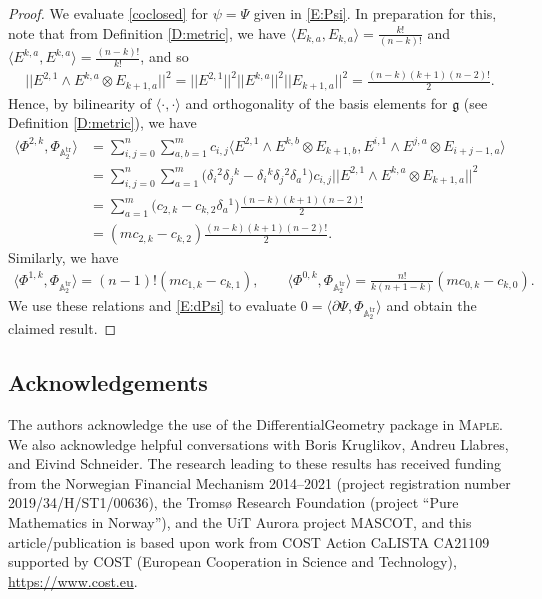 \documentclass[10pt,a4paper]{amsart}
\newcommand\tensor{\otimes}
\DeclareMathOperator{\tr}{tr}
\newcommand{\g}{\mathfrak{g}}
\newcommand\bbA{\mathbb{A}}
\numberwithin{equation}{section}
\begin{document}
\begin{proof}
We evaluate \eqref{coclosed} for $\psi = \Psi$ given in \eqref{E:Psi}. In preparation for this, note that from Definition \ref{D:metric}, we have $\langle E_{k,a}, E_{k,a} \rangle = \frac{k!}{(n-k)!}$ and $\langle E^{k,a}, E^{k,a} \rangle = \frac{(n-k)!}{k!}$, and so
\begin{align*}
 \big|\big|E^{2,1} \wedge E^{k,a} \tensor E_{k+1,a}\big|\big|^2 = \big|\big|E^{2,1}\big|\big|^2 \big|\big|E^{k,a}\big|\big|^2\big|\big|E_{k+1,a}\big|\big|^2 = \frac{(n-k)(k+1)(n-2)!}{2}.
\end{align*}
 Hence, by bilinearity of $\langle \cdot,\cdot \rangle$ and orthogonality of the basis elements for $\g$ (see Definition \ref{D:metric}), we have
\begin{align*}%
\big\langle \Phi^{2,k}, \Phi_{\bbA_2^{\tr}} \big\rangle
&= \sum_{i,j=0}^n\sum_{a,b=1}^m c_{i,j}\big\langle E^{2,1} \wedge E^{k,b} \tensor E_{k+1,b}, E^{i,1} \wedge E^{j,a} \tensor E_{i+j-1,a} \big\rangle\\
&= \sum_{i,j=0}^n \sum_{a=1}^m \bigl(\delta_i{}^2\delta_j{}^k - \delta_i{}^k \delta_j{}^2 \delta_a{}^1\bigr) c_{i,j} \big|\big|E^{2,1} \wedge E^{k,a}\tensor E_{k+1,a}\big|\big|^2\\
&= \sum_{a=1}^m \bigl(c_{2,k} - c_{k,2} \delta_a{}^1\bigr) \frac{(n-k)(k+1)(n-2)!}{2} \\
&= (mc_{2,k} - c_{k,2} ) \frac{(n-k)(k+1)(n-2)!}{2}.
\end{align*}
Similarly, we have
\begin{align*}
\big\langle \Phi^{1,k}, \Phi_{\bbA_2^{\tr}} \big\rangle = (n-1)!(mc_{1,k}-c_{k,1}), \qquad
\big\langle \Phi^{0,k}, \Phi_{\bbA_2^{\tr}} \big\rangle = \frac{n!}{k(n+1-k)}(mc_{0,k}-c_{k,0}).
\end{align*}
 We use these relations and \eqref{E:dPsi} to evaluate $0 = \langle\partial\Psi,\Phi_{\bbA_2^{\tr}} \rangle$ and obtain the claimed result.
 \end{proof}


\subsection*{Acknowledgements}

The authors acknowledge the use of the DifferentialGeometry package in \textsc{Maple}. We also acknowledge helpful conversations with Boris Kruglikov, Andreu Llabres, and Eivind Schneider. The research leading to these results has received funding from the Norwegian Financial Mechanism 2014--2021 (project registration number 2019/34/H/ST1/00636), the Troms\o{} Research Foundation (project ``Pure Mathematics in Norway''), and the UiT Aurora project MASCOT, and this article/publication is based upon work from COST Action CaLISTA CA21109 supported by COST (European Cooperation in Science and Technology), \url{https://www.cost.eu}.
\end{document}
